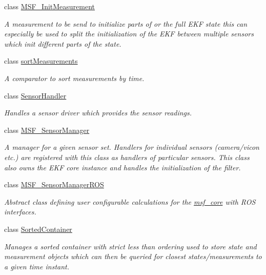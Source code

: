\begin{DoxyCompactItemize}
class \hyperlink{classmsf__core_1_1MSF__InitMeasurement}{M\-S\-F\-\_\-\-Init\-Measurement}
\begin{DoxyCompactList}\small\item\em A measurement to be send to initialize parts of or the full E\-K\-F state this can especially be used to split the initialization of the E\-K\-F between multiple sensors which init different parts of the state. \end{DoxyCompactList}\item 
class \hyperlink{classmsf__core_1_1sortMeasurements}{sort\-Measurements}
\begin{DoxyCompactList}\small\item\em A comparator to sort measurements by time. \end{DoxyCompactList}\item 
class \hyperlink{classmsf__core_1_1SensorHandler}{Sensor\-Handler}
\begin{DoxyCompactList}\small\item\em Handles a sensor driver which provides the sensor readings. \end{DoxyCompactList}\item 
class \hyperlink{classmsf__core_1_1MSF__SensorManager}{M\-S\-F\-\_\-\-Sensor\-Manager}
\begin{DoxyCompactList}\small\item\em A manager for a given sensor set. Handlers for individual sensors (camera/vicon etc.) are registered with this class as handlers of particular sensors. This class also owns the E\-K\-F core instance and handles the initialization of the filter. \end{DoxyCompactList}\item 
class \hyperlink{structmsf__core_1_1MSF__SensorManagerROS}{M\-S\-F\-\_\-\-Sensor\-Manager\-R\-O\-S}
\begin{DoxyCompactList}\small\item\em Abstract class defining user configurable calculations for the \hyperlink{namespacemsf__core}{msf\-\_\-core} with R\-O\-S interfaces. \end{DoxyCompactList}\item 
class \hyperlink{classmsf__core_1_1SortedContainer}{Sorted\-Container}
\begin{DoxyCompactList}\small\item\em Manages a sorted container with strict less than ordering used to store state and measurement objects which can then be queried for closest states/measurements to a given time instant. \end{DoxyCompactList}\item 

\end{DoxyCompactItemize}
